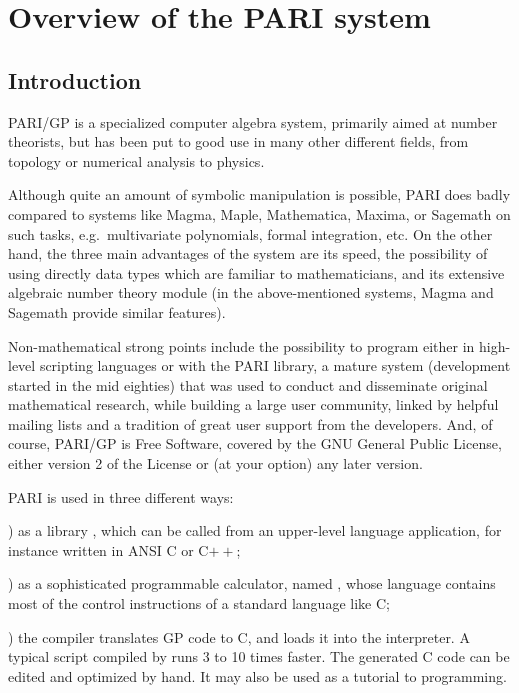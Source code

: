 %
%
\chapter{Overview of the PARI system}

\section{Introduction}

\noindent
PARI/GP is a specialized computer algebra system, primarily aimed at number
theorists, but has been put to good use in many other different fields, from
topology or numerical analysis to physics.

Although quite an amount of symbolic manipulation is possible, PARI does
badly compared to systems like Magma, Maple, Mathematica, Maxima, or
Sagemath on such tasks, e.g.~multivariate polynomials, formal integration,
etc. On the other hand, the three main advantages of the system are its
speed, the possibility of using directly data types which are familiar to
mathematicians, and its extensive algebraic number theory module (in
the above-mentioned systems, Magma and Sagemath provide similar features).

Non-mathematical strong points include the possibility to program either
in high-level scripting languages or with the PARI library, a mature system
(development started in the mid eighties) that was used to conduct and
disseminate original mathematical research, while building a large user
community, linked by helpful mailing lists and a tradition of great user
support from the developers. And, of course, PARI/GP is Free Software,
covered by the GNU General Public License, either version 2 of the License or
(at your option) any later version.

PARI is used in three different ways:

) as a library , which can be called from an upper-level
language application, for instance written in ANSI C or C$++$;

) as a sophisticated programmable calculator, named , whose
language  contains most of the control instructions of a standard
language like C;

) the compiler  translates GP code to C, and loads it into
the  interpreter. A typical script compiled by  runs 3 to 10
times faster. The generated C code can be edited and optimized by hand. It
may also be used as a tutorial to  programming.

